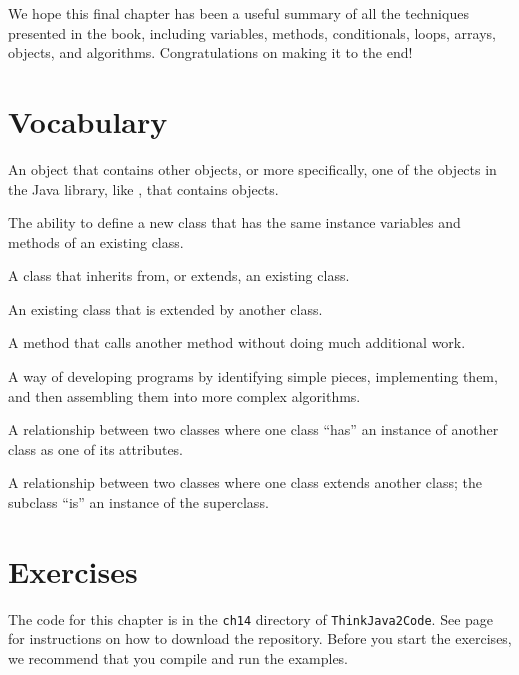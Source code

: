 We hope this final chapter has been a useful summary of all the techniques presented in the book, including variables, methods, conditionals, loops, arrays, objects, and algorithms.
Congratulations on making it to the end!


\section{Vocabulary}

\begin{description}

An object that contains other objects, or more specifically, one of the objects in the Java library, like , that contains objects.

The ability to define a new class that has the same instance variables and methods of an existing class.

A class that inherits from, or extends, an existing class.

An existing class that is extended by another class.


A method that calls another method without doing much additional work.

A way of developing programs by identifying simple pieces, implementing them, and then assembling them into more complex algorithms.

A relationship between two classes where one class ``has'' an instance of another class as one of its attributes.

A relationship between two classes where one class extends another class; the subclass ``is'' an instance of the superclass.

\end{description}


\section{Exercises}

The code for this chapter is in the {\tt ch14} directory of {\tt ThinkJava2Code}.
See page~\pageref{code} for instructions on how to download the repository.
Before you start the exercises, we recommend that you compile and run the examples.

